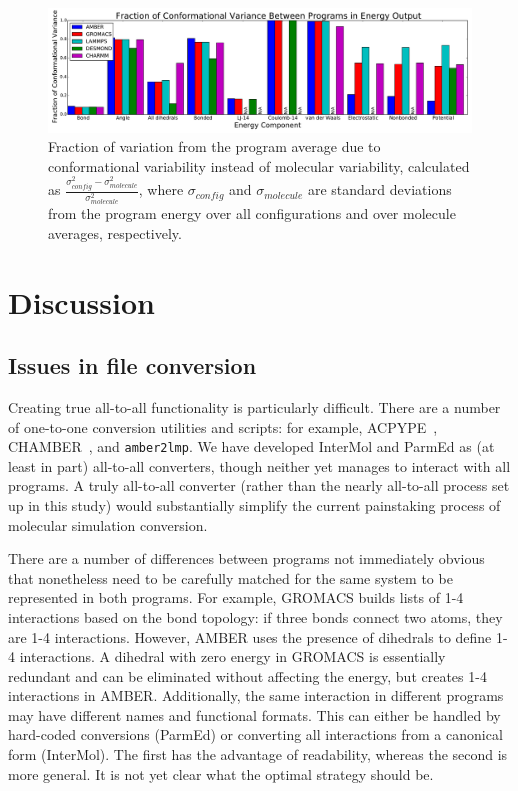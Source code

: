 \begin{figure}[h]
\includegraphics[width=\textwidth]{fractionofvariation.pdf}   
\caption{Fraction of variation from the program average due to
  conformational variability instead of molecular variability,
  calculated as
  $\frac{\sigma^2_{config}-\sigma^2_{molecule}}{\sigma^2_{molecule}}$,
  where $\sigma_{config}$ and $\sigma_{molecule}$ are standard
  deviations from the program energy over all configurations and over
  molecule averages, respectively.
\label{fig:confvariability}}
\end{figure}

\section*{Discussion}

\subsection*{Issues in file conversion}
Creating true all-to-all functionality is particularly
difficult. There are a number of one-to-one conversion utilities and
scripts: for example, ACPYPE~\cite{sousa_da_silva_acpype_2012},
CHAMBER~\citep{crowley_chamber:_2009}, and {\tt amber2lmp}.  We have
developed InterMol and ParmEd as (at least in part) all-to-all
converters, though neither yet manages to interact with all programs.
A truly all-to-all converter (rather than the nearly all-to-all
process set up in this study) would substantially simplify the current
painstaking process of molecular simulation conversion.

There are a number of differences between programs not immediately
obvious that nonetheless need to be carefully matched for the same
system to be represented in both programs.  For example, GROMACS
builds lists of 1-4 interactions based on the bond topology: if three
bonds connect two atoms, they are 1-4 interactions. However, AMBER
uses the presence of dihedrals to define 1-4 interactions. A dihedral
with zero energy in GROMACS is essentially redundant and can be
eliminated without affecting the energy, but creates 1-4 interactions
in AMBER.  Additionally, the same interaction in different programs
may have different names and functional formats. This can either be
handled by hard-coded conversions (ParmEd) or converting all
interactions from a canonical form (InterMol).  The first has
the advantage of readability, whereas the second is more general.  It
is not yet clear what the optimal strategy should be.

